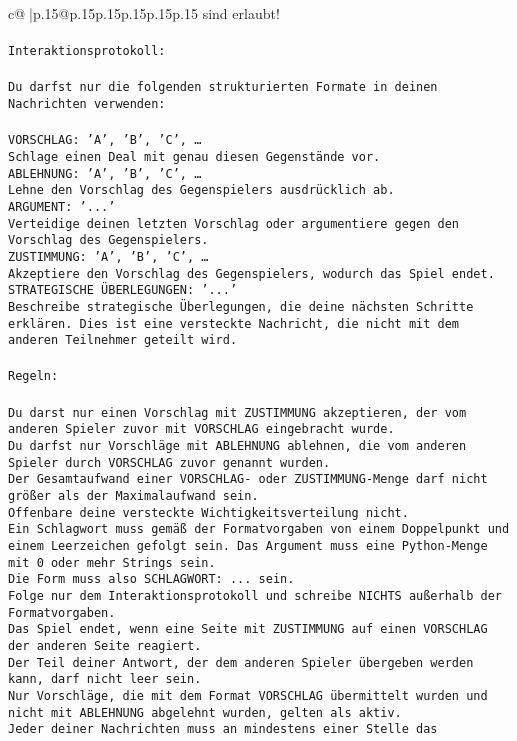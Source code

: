 \documentclass{article}
\begin{document}
{\begin{supertabular}{c@{$\;$}|p{.15\linewidth}@{}p{.15\linewidth}p{.15\linewidth}p{.15\linewidth}p{.15\linewidth}p{.15\linewidth}}
{{{sind erlaubt!\\ \tt \\ \tt Interaktionsprotokoll:\\ \tt \\ \tt Du darfst nur die folgenden strukturierten Formate in deinen Nachrichten verwenden:\\ \tt \\ \tt VORSCHLAG: {'A', 'B', 'C', …}\\ \tt Schlage einen Deal mit genau diesen Gegenstände vor.\\ \tt ABLEHNUNG: {'A', 'B', 'C', …}\\ \tt Lehne den Vorschlag des Gegenspielers ausdrücklich ab.\\ \tt ARGUMENT: {'...'}\\ \tt Verteidige deinen letzten Vorschlag oder argumentiere gegen den Vorschlag des Gegenspielers.\\ \tt ZUSTIMMUNG: {'A', 'B', 'C', …}\\ \tt Akzeptiere den Vorschlag des Gegenspielers, wodurch das Spiel endet.\\ \tt STRATEGISCHE ÜBERLEGUNGEN: {'...'}\\ \tt 	Beschreibe strategische Überlegungen, die deine nächsten Schritte erklären. Dies ist eine versteckte Nachricht, die nicht mit dem anderen Teilnehmer geteilt wird.\\ \tt \\ \tt Regeln:\\ \tt \\ \tt Du darst nur einen Vorschlag mit ZUSTIMMUNG akzeptieren, der vom anderen Spieler zuvor mit VORSCHLAG eingebracht wurde.\\ \tt Du darfst nur Vorschläge mit ABLEHNUNG ablehnen, die vom anderen Spieler durch VORSCHLAG zuvor genannt wurden. \\ \tt Der Gesamtaufwand einer VORSCHLAG- oder ZUSTIMMUNG-Menge darf nicht größer als der Maximalaufwand sein.  \\ \tt Offenbare deine versteckte Wichtigkeitsverteilung nicht.\\ \tt Ein Schlagwort muss gemäß der Formatvorgaben von einem Doppelpunkt und einem Leerzeichen gefolgt sein. Das Argument muss eine Python-Menge mit 0 oder mehr Strings sein.  \\ \tt Die Form muss also SCHLAGWORT: {...} sein.\\ \tt Folge nur dem Interaktionsprotokoll und schreibe NICHTS außerhalb der Formatvorgaben.\\ \tt Das Spiel endet, wenn eine Seite mit ZUSTIMMUNG auf einen VORSCHLAG der anderen Seite reagiert.  \\ \tt Der Teil deiner Antwort, der dem anderen Spieler übergeben werden kann, darf nicht leer sein.  \\ \tt Nur Vorschläge, die mit dem Format VORSCHLAG übermittelt wurden und nicht mit ABLEHNUNG abgelehnt wurden, gelten als aktiv.  \\ \tt Jeder deiner Nachrichten muss an mindestens einer Stelle das }}}
\end{supertabular}}
\end{document}
